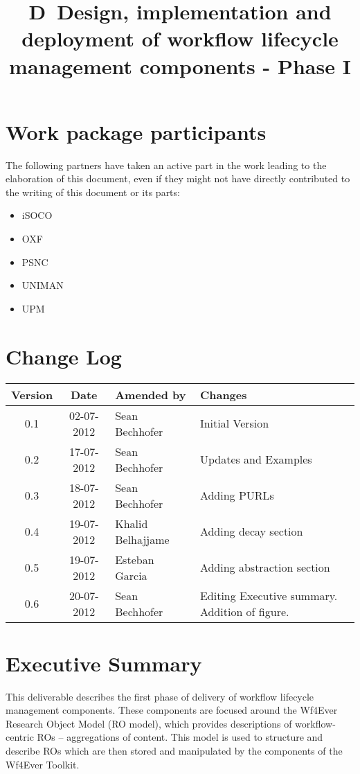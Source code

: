 \documentclass[a4paper, twoside, 11pt]{article}
\title{D\delid\ Design, implementation and deployment of workflow
  lifecycle management components - Phase I}
\begin{document}
\maketitle

\section*{Work package participants} The following partners have taken an active part in the work leading to the elaboration of this document, even if they might not have directly contributed to the writing of this document or its parts: %
\begin{itemize}
\item iSOCO
\item OXF
\item PSNC
\item UNIMAN
\item UPM
\end{itemize}

\section*{Change Log}
\begin{centering}

\begin{tabular}{|c|c|p{4.92cm}|p{6.5cm}|}

\hline \textbf{Version} & \textbf{Date} & \textbf{Amended by} & \textbf{Changes} \\ \hline
0.1 & 02-07-2012 & Sean Bechhofer & Initial Version \\ \hline
0.2 & 17-07-2012 & Sean Bechhofer & Updates and Examples \\ \hline
0.3 & 18-07-2012 & Sean Bechhofer & Adding PURLs\\ \hline
0.4 & 19-07-2012 & Khalid Belhajjame & Adding decay section \\ \hline
0.5 & 19-07-2012 & Esteban Garcia & Adding abstraction section \\ \hline
0.6 & 20-07-2012 & Sean Bechhofer & Editing Executive
summary. Addition of figure. \\ \hline

\end{tabular}

\end{centering}
\clearpage
\section*{Executive Summary}
This deliverable describes the first phase of delivery of workflow
lifecycle management components. These components are focused around
the Wf4Ever Research Object Model (RO model), which provides
descriptions of workflow-centric ROs -- aggregations of content. This
model is used to structure and describe ROs which are then stored and
manipulated by the components of the Wf4Ever Toolkit.
\end{document}
